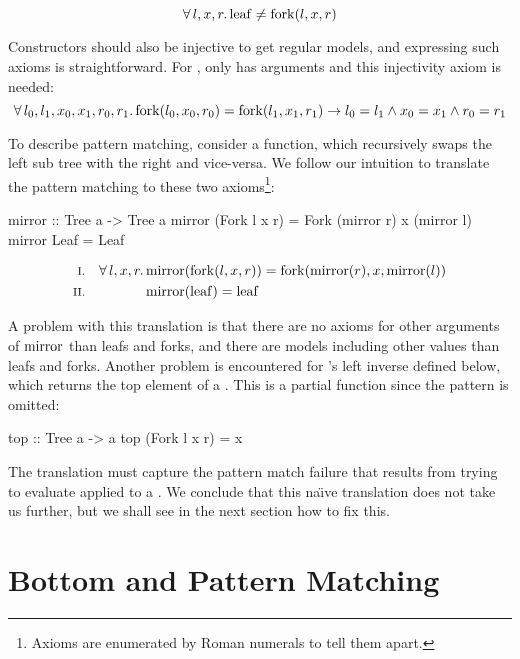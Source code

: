 \begin{equation*}
\forall \, l , x , r . \, \mathrm{leaf} \neq \mathrm{fork}(l,x,r)
\end{equation*}

Constructors should also be injective to get regular models, and
expressing such axioms is straightforward. For , only  has
arguments and this injectivity axiom is needed:
\begin{equation*}
\forall \, l_0 , l_1 , x_0 , x_1 , r_0 , r_1 . \, \mathrm{fork}(l_0,x_0,r_0) =
\mathrm{fork}(l_1,x_1,r_1) \rightarrow l_0 = l_1 \wedge x_0 = x_1 \wedge r_0 = r_1
\end{equation*}

To describe pattern matching, consider a  function, which
recursively swaps the left sub tree with the right and vice-versa. We
follow our intuition to translate the pattern matching to these
two axioms\footnote {Axioms are enumerated by Roman numerals to tell
  them apart.}:

\begin{code}
mirror :: Tree a -> Tree a
mirror (Fork l x r) = Fork (mirror r) x (mirror l)
mirror Leaf         = Leaf
\end{code}
\begin{align*}
\rom{1} && \faaa{l}{x}{r} & \fn{mirror}(\fn{fork}(l,x,r)) \eq \fn{fork}(\fn{mirror}(r),x,\fn{mirror}(l)) \\
\rom{2} &&                & \fn{mirror}(\fn{leaf}) \eq \fn{leaf}
\end{align*}

\noindent
A problem with this translation is that there are no axioms for other
arguments of $\mathrm{mirror}$ than leafs and forks, and there are models
including other values than leafs and forks. Another problem is
encountered for 's left inverse  defined below,
which returns the top element of a . This is a partial
function since the  pattern is omitted:

\begin{code}
top :: Tree a -> a
top (Fork l x r) = x
\end{code}

The translation must capture the pattern match failure that results
from trying to evaluate  applied to a . We conclude
that this na\"{\i}ve translation does not take us further, but we
shall see in the next section how to fix this.

\section{Bottom and Pattern Matching}

